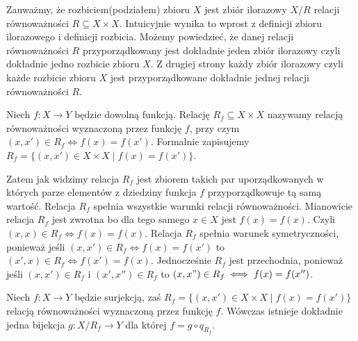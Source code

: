 \begin{remark}
Zauważmy, że rozbiciem(podziałem) zbioru $X$ jest zbiór ilorazowy $X/R$ relacji równoważności $R\subseteq X\times X$. Intuicyjnie wynika to wprost z definicji zbioru ilorazowego i definicji rozbicia. Możemy powiedzieć, że danej relacji równoważności $R$ przyporządkowany jest dokładnie jeden zbiór ilorazowy czyli dokładnie jedno rozbicie zbioru $X$. Z drugiej strony każdy zbiór ilorazowy czyli każde rozbicie zbioru $X$ jest przyporządkowane dokładnie jednej relacji równoważności $R$.
\end{remark}
\begin{definition}
Niech $f:X\rightarrow Y$ będzie dowolną funkcją. Relację $R_{f}\subseteq X\times X$ nazywamy relacją równoważności wyznaczoną przez funkcję $f$, przy czym $(x,x')\in R_{f}\iff f(x)=f(x')$. Formalnie zapisujemy $R_{f}=\{(x,x')\in X\times X\mid f(x)=f(x')\}$.
\end{definition}
\begin{remark}
Zatem jak widzimy relacja $R_{f}$ jest zbiorem takich par uporządkowanych w których parze elementów z dziedziny funkcja $f$ przyporządkowuje tą samą wartość. Relacja $R_{f}$ spełnia wszystkie warunki relacji równoważności. Mianowicie relacja $R_{f}$ jest zwrotna bo dla tego samego $x\in X$ jest $f(x)=f(x)$. Czyli $(x,x)\in R_{f}\iff f(x)=f(x)$. Relacja $R_{f}$ spełnia warunek symetryczności, ponieważ jeśli $(x,x')\in R_{f}\iff f(x)=f(x')$ to $(x',x)\in R_{f}\iff f(x')=f(x)$. Jednocześnie $R_{f}$ jest przechodnia, ponieważ jeśli $(x,x')\in R_{f}$ i $(x',x'')\in R_{f}$ to $(x,x")\in R_{f}\iff f(x)=f(x'')$.
\end{remark}
\begin{theorem}
Niech $f:X\rightarrow Y$ będzie surjekcją, zaś $R_{f}=\{(x,x')\in X\times X\mid f(x)=f(x')\}$ relacją równoważności wyznaczoną przez funkcję $f$. Wówczas istnieje dokładnie jedna bijekcja $g:X/R_{f}\rightarrow Y$ dla której $f=g\circ q_{R_{f}}$.
\end{theorem}
